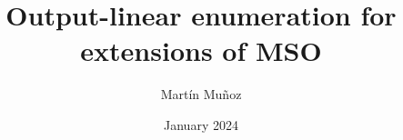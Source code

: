 \documentclass[pdftex]{pucthesis}	%
\begin{document}

\title[Output-linear enumeration for extensions of MSO]
   {\bf Output-linear enumeration for extensions of MSO}       
\author[Martín Muñoz]{Martín Muñoz}

\address{Escuela de Ingenier\'ia\\
                   Pontificia Universidad Cat\'olica de Chile\\ 
                   Vicu\~na Mackenna 4860\\
                  Santiago, Chile\\
                  {\it Tel.\/} : 56 (2) 354-2000}

\subject                            {Computer Science}
\date                                 {January 2024}
\dedication                      {To my family again, why not}


\NoChapterPageNumber
{}
\maketitle



\end{document}
